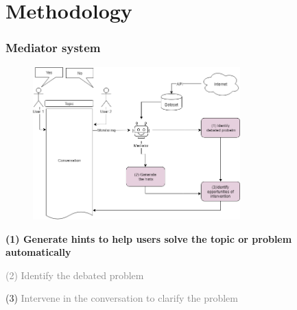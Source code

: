 \documentclass{beamer}
\begin{document}
\section{Methodology} %
\begin{frame}
\frametitle{Mediator system}
\begin{figure}
	\includegraphics[width=80mm]{sys2.png}
\end{figure}

\end{frame}
\begin{frame}
\par 	\textbf{(1)  Generate hints to help users solve the topic or problem automatically}
\par \textcolor{gray}{(2) Identify the debated problem }
\par (3) \textcolor{gray}{ Intervene in the conversation to clarify the problem }
\end{frame}
\end{document}
